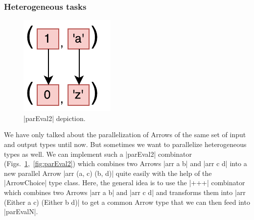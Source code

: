 \subsubsection{Heterogeneous tasks}
\begin{figure}[tb]
	\includegraphics[scale=0.7]{images/parEval2}
	\caption{|parEval2| depiction.}
	\label{fig:parEval2Img}
\end{figure}
We have only talked about the parallelization of Arrows of the same set of input and output types until now. But sometimes we want to parallelize heterogeneous types as well. We can implement such a |parEval2| combinator (Figs.~\ref{fig:parEval2Img},~\ref{fig:parEval2}) which combines two Arrows |arr a b| and |arr c d| into a new parallel Arrow |arr (a, c) (b, d)| quite easily with the help of the |ArrowChoice| type class. Here, the general idea is to use the |+++| combinator which combines two Arrows |arr a b| and |arr c d| and transforms them into |arr (Either a c) (Either b d)| to get a common Arrow type that we can then feed into |parEvalN|.

